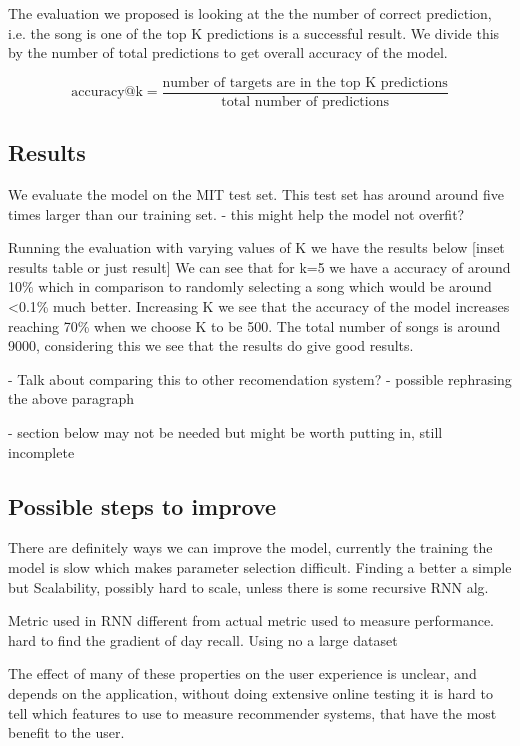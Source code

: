 \documentclass{article} %
\begin{document}
The evaluation we proposed is looking at the the number of correct prediction, i.e. the song is one of the top K predictions is a successful result. We divide this by the number of total predictions to get overall accuracy of the model.

\begin{equation}
\text{accuracy@k} = \frac{\text{number of targets are in the top K predictions}}{\text{total number of predictions}}
\end{equation}
\subsection{Results}

We evaluate the model on the MIT test set. This test set has around around five times larger than our training set. - this might help the model not overfit?

Running the evaluation with varying values of K we have the results below 
[inset results table or just result] 
We can see that for k=5 we have a accuracy of around 10\% which in comparison to randomly selecting a song which would be around <0.1\% much better. Increasing K we see that the accuracy of the model increases reaching 70\% when we choose K to be 500. The total number of songs is around 9000, considering this we see that the results do give good results. 

 - Talk about comparing this to other recomendation system?
 - possible rephrasing the above paragraph


- section below may not be needed but might be worth putting in, still incomplete

\subsection{Possible steps to improve}
There are definitely ways we can improve the model, currently the training the model is slow which makes parameter selection difficult. Finding a better a simple but
Scalability, possibly hard to scale, unless there is some recursive RNN alg. 

Metric used in RNN different from actual metric used to measure performance.
	hard to find the gradient of day recall.
Using no a large dataset

The effect of many of these properties on the user experience is unclear, and depends on the application, without doing extensive online testing it is hard to tell which features to use to measure recommender systems, that have the most benefit to the user.
\end{document}
